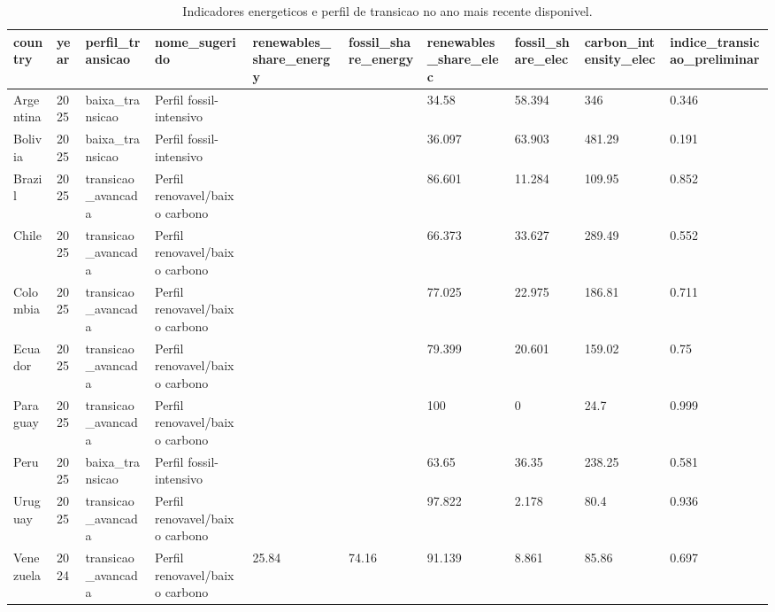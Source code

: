 \begin{table}[htbp]
\centering
\caption{Indicadores energeticos e perfil de transicao no ano mais recente disponivel.}
\label{tab:paises-ano-recente-indicadores-perfil}
\begin{tabular}{llllllllll}
\hline
country & year & perfil\_transicao & nome\_sugerido & renewables\_share\_energy & fossil\_share\_energy & renewables\_share\_elec & fossil\_share\_elec & carbon\_intensity\_elec & indice\_transicao\_preliminar \\
\hline
Argentina & 2025 & baixa\_transicao & Perfil fossil-intensivo &  &  & 34.58 & 58.394 & 346 & 0.346 \\
Bolivia & 2025 & baixa\_transicao & Perfil fossil-intensivo &  &  & 36.097 & 63.903 & 481.29 & 0.191 \\
Brazil & 2025 & transicao\_avancada & Perfil renovavel/baixo carbono &  &  & 86.601 & 11.284 & 109.95 & 0.852 \\
Chile & 2025 & transicao\_avancada & Perfil renovavel/baixo carbono &  &  & 66.373 & 33.627 & 289.49 & 0.552 \\
Colombia & 2025 & transicao\_avancada & Perfil renovavel/baixo carbono &  &  & 77.025 & 22.975 & 186.81 & 0.711 \\
Ecuador & 2025 & transicao\_avancada & Perfil renovavel/baixo carbono &  &  & 79.399 & 20.601 & 159.02 & 0.75 \\
Paraguay & 2025 & transicao\_avancada & Perfil renovavel/baixo carbono &  &  & 100 & 0 & 24.7 & 0.999 \\
Peru & 2025 & baixa\_transicao & Perfil fossil-intensivo &  &  & 63.65 & 36.35 & 238.25 & 0.581 \\
Uruguay & 2025 & transicao\_avancada & Perfil renovavel/baixo carbono &  &  & 97.822 & 2.178 & 80.4 & 0.936 \\
Venezuela & 2024 & transicao\_avancada & Perfil renovavel/baixo carbono & 25.84 & 74.16 & 91.139 & 8.861 & 85.86 & 0.697 \\
\hline
\end{tabular}
\end{table}
